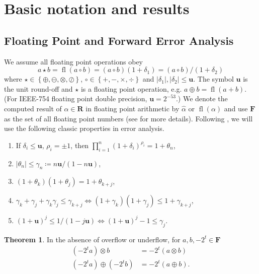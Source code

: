 \documentclass[letterpaper,10pt]{article}
\theoremstyle{definition}
\newtheorem{theorem}{Theorem}[section]
\newcommand{\fl}[1]{\operatorname{fl}\left(#1\right)}
\newcommand{\mach}{\mathbf{u}}
\begin{document}
\section{Basic notation and results}\label{sec:notation}

\subsection{Floating Point and Forward Error Analysis}

We assume all floating point operations obey
\begin{equation}
  a \star b = \fl{a \circ b} = (a \circ b)(1 + \delta_1) =
  (a \circ b) / (1 + \delta_2)
\end{equation}
where \(\star \in \left\{\oplus, \ominus, \otimes, \oslash\right\}\), \(\circ
\in \left\{+, -, \times, \div\right\}\) and \(\left|\delta_1\right|,
\left|\delta_2\right| \leq \mach\). The symbol \(\mach\) is the unit round-off
and \(\star\) is a floating point operation, e.g.
\(a \oplus b = \fl{a + b}\). (For IEEE-754 floating point double precision,
\(\mach = 2^{-53}\).) We denote the computed result of
\(\alpha \in \mathbf{R}\) in floating point arithmetic by
\(\widehat{\alpha}\) or \(\fl{\alpha}\) and use \(\mathbf{F}\) as the set of
all floating point numbers (see \cite{Higham2002} for more details).
Following \cite{Higham2002}, we will use the following classic properties in
error analysis.

\begin{enumerate}
  \item If \(\delta_i \leq \mach\), \(\rho_i = \pm 1\), then
      \(\prod_{i = 1}^n (1 + \delta_i)^{\rho_i} = 1 + \theta_n\),
  \item \(\left|\theta_n\right| \leq \gamma_n \coloneqq
      n \mach / (1 - n \mach)\),
  \item \((1 + \theta_k)(1 + \theta_j) = 1 + \theta_{k + j}\),
  \item \(\gamma_k + \gamma_j + \gamma_k \gamma_j \leq \gamma_{k + j}
    \Longleftrightarrow (1 + \gamma_k)(1 + \gamma_j) \leq 1 + \gamma_{k + j}\),
  \item \((1 + \mach)^j \leq 1 / (1 - j \mach) \Longleftrightarrow
  (1 + \mach)^j - 1 \leq \gamma_j\).
\end{enumerate}

\begin{theorem}\label{thm:floating-point-exact}
In the absence of overflow or underflow, for \(a, b, -2^t \in \mathbf{F}\)
\begin{align}
\left(-2^t a\right) \otimes b &= -2^t \left(a \otimes b\right) \\
\left(-2^t a\right) \oplus \left(-2^t b\right) &= -2^t \left(a \oplus b\right).
\end{align}
\end{theorem}
\end{document}
